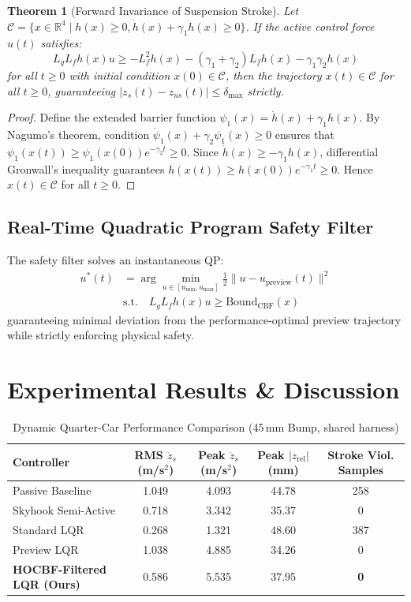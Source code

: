 \documentclass[journal,twocolumn,letterpaper]{IEEEtran}
\newtheorem{theorem}{Theorem}
\begin{document}
\begin{theorem}[Forward Invariance of Suspension Stroke]
Let $\mathcal{C} = \{x \in \mathbb{R}^4 \mid h(x) \ge 0, \dot{h}(x) + \gamma_1 h(x) \ge 0\}$. If the active control force $u(t)$ satisfies:
\begin{equation}
L_g L_f h(x) u \ge - L_f^2 h(x) - (\gamma_1 + \gamma_2) L_f h(x) - \gamma_1 \gamma_2 h(x)
\end{equation}
for all $t \ge 0$ with initial condition $x(0) \in \mathcal{C}$, then the trajectory $x(t) \in \mathcal{C}$ for all $t \ge 0$, guaranteeing $|z_s(t) - z_{us}(t)| \le \delta_{\max}$ strictly.
\end{theorem}

\begin{proof}
Define the extended barrier function $\psi_1(x) = \dot{h}(x) + \gamma_1 h(x)$. By Nagumo's theorem, condition $\dot{\psi}_1(x) + \gamma_2 \psi_1(x) \ge 0$ ensures that $\psi_1(x(t)) \ge \psi_1(x(0)) e^{-\gamma_2 t} \ge 0$. Since $\dot{h}(x) \ge -\gamma_1 h(x)$, differential Gronwall's inequality guarantees $h(x(t)) \ge h(x(0)) e^{-\gamma_1 t} \ge 0$. Hence $x(t) \in \mathcal{C}$ for all $t \ge 0$.
\end{proof}

\subsection{Real-Time Quadratic Program Safety Filter}
The safety filter solves an instantaneous QP:
\begin{align}
u^*(t) &= \arg\min_{u \in [u_{\min}, u_{\max}]} \frac{1}{2} \|u - u_{\text{preview}}(t)\|^2 \\
&\text{s.t.} \quad L_g L_f h(x) u \ge \text{Bound}_{\text{CBF}}(x)
\end{align}
guaranteeing minimal deviation from the performance-optimal preview trajectory while strictly enforcing physical safety.

\section{Experimental Results \& Discussion}

\begin{table}[t]
\centering
\caption{Dynamic Quarter-Car Performance Comparison (45\,mm Bump, shared harness)}
\label{tab:results}
\begin{tabular}{lcccc}
\toprule
\textbf{Controller} & \textbf{RMS $\ddot{z}_s$ (m/s$^2$)} & \textbf{Peak $\ddot{z}_s$ (m/s$^2$)} & \textbf{Peak $|z_{\text{rel}}|$ (mm)} & \textbf{Stroke Viol. Samples} \\
\midrule
Passive Baseline     & 1.049 & 4.093 & 44.78 & 258 \\
Skyhook Semi-Active  & 0.718 & 3.342 & 35.37 & 0 \\
Standard LQR         & 0.268 & 1.321 & 48.60 & 387 \\
Preview LQR          & 1.038 & 4.885 & 34.26 & 0 \\
\textbf{HOCBF-Filtered LQR (Ours)} & 0.586 & 5.535 & 37.95 & \textbf{0} \\
\bottomrule
\end{tabular}
\end{table}
\end{document}
